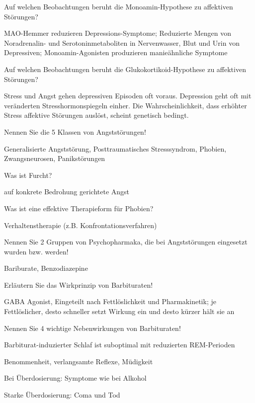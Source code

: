 \documentclass[10pt, a4paper]{exam}
\begin{document}
\begin{questions}
  \question Auf welchen Beobachtungen beruht die Monoamin-Hypothese zu affektiven Störungen?
  \begin{solution}
    MAO-Hemmer reduzieren Depressions-Symptome;
    Reduzierte Mengen von Noradrenalin- und Serotoninmetaboliten in Nervenwasser, Blut und Urin von Depressiven;
    Monoamin-Agonisten produzieren manieähnliche Symptome
  \end{solution}

  \question Auf welchen Beobachtungen beruht die Glukokortikoid-Hypothese zu affektiven Störungen?
  \begin{solution}
    Stress und Angst gehen depressiven Episoden oft voraus.
    Depression geht oft mit veränderten Stresshormonspiegeln einher.
    Die Wahrscheinlichkeit, dass erhöhter Stress affektive Störungen auslöst, scheint genetisch bedingt.
  \end{solution}

  \question Nennen Sie die 5 Klassen von Angststörungen!
  \begin{solution}
    Generalisierte Angststörung, Posttraumatisches Stresssyndrom, Phobien, Zwangsneurosen, Panikstörungen
  \end{solution}

  \question Was ist Furcht?
  \begin{solution}
    auf konkrete Bedrohung gerichtete Angst
  \end{solution}

  \question Was ist eine effektive Therapieform für Phobien?
  \begin{solution}
    Verhaltenstherapie (z.B. Konfrontationsverfahren)
  \end{solution}

  \question Nennen Sie 2 Gruppen von Psychopharmaka, die bei Angststörungen eingesetzt wurden bzw. werden!
  \begin{solution}
    Bariburate, Benzodiazepine
  \end{solution}

  \question Erläutern Sie das Wirkprinzip von Barbituraten!
  \begin{solution}
    GABA Agonist, Eingeteilt nach Fettlöslichkeit und Pharmakinetik; je Fettlöslicher, desto schneller setzt Wirkung ein und desto kürzer hält sie an
  \end{solution}

  \question Nennen Sie 4 wichtige Nebenwirkungen von Barbituraten!
  \begin{solution}
    \begin{itemize*}
      \item Barbiturat-induzierter Schlaf ist suboptimal mit reduzierten REM-Perioden
      \item Benommenheit, verlangsamte Reflexe, Müdigkeit
      \item Bei Überdosierung: Symptome wie bei Alkohol
      \item Starke Überdosierung: Coma und Tod
    \end{itemize*}
  \end{solution}


\end{questions}
\end{document}
